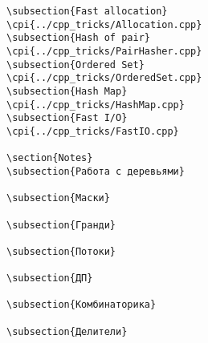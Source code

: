 {\begin{verbatim}
\subsection{Fast allocation}
\cpi{../cpp_tricks/Allocation.cpp}
\subsection{Hash of pair}
\cpi{../cpp_tricks/PairHasher.cpp}
\subsection{Ordered Set}
\cpi{../cpp_tricks/OrderedSet.cpp}
\subsection{Hash Map}
\cpi{../cpp_tricks/HashMap.cpp}
\subsection{Fast I/O}
\cpi{../cpp_tricks/FastIO.cpp}

\section{Notes}
\subsection{Работа с деревьями}

\subsection{Маски}

\subsection{Гранди}

\subsection{Потоки}
 
\subsection{ДП}

\subsection{Комбинаторика}

\subsection{Делители}


\end{verbatim}}
